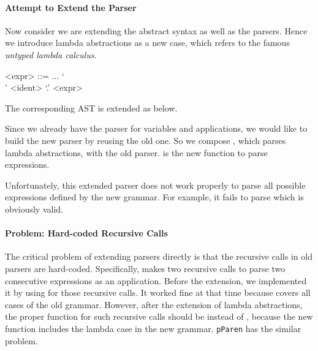 \paragraph{Attempt to Extend the Parser} Now consider we are extending the abstract syntax as well as the parsers. Hence we introduce lambda abstractions as a new case, which refers to the famous \textit{untyped lambda calculus}.

\setlength{\grammarindent}{5em}
\begin{grammar}
<expr> ::= ...
    \alt `\\' <ident> `.' <expr>
\end{grammar}

The corresponding AST is extended as below.


Since we already have the parser for variables and applications, we would like to build the new parser by reusing the old one. So we compose , which parses lambda abstractions, with the old parser.  is the new function to parse expressions.


Unfortunately, this extended parser does not work properly to parse all possible expressions defined by the new grammar. For example, it fails to parse   which is obviously valid.

\paragraph{Problem: Hard-coded Recursive Calls} The critical problem of extending parsers directly is that the recursive calls in old parsers are hard-coded. Specifically,  makes two recursive calls to parse two consecutive expressions as an application. Before the extension, we implemented it by using  for those recursive calls. It worked fine at that time because  covers all cases of the old grammar. However, after the extension of lambda abstractions, the proper function for such recursive calls should be  instead of , because the new function  includes the lambda case in the new grammar. \lstinline{pParen} has the similar problem.

